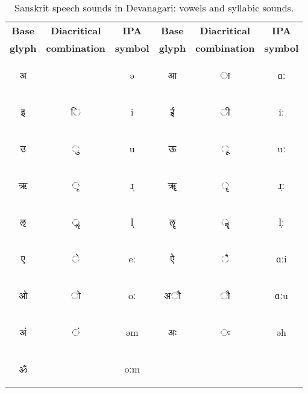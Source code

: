 \documentclass[10pt,a4paper]{article}
\newcommand{\sansk}[1]{\begin{sanskrit}#1\end{sanskrit}}
\begin{document}
\begin{table*}[ht]
	\begin{center}
		\begin{tabular}{|c|c|c||c|c|c|}
			\hline
			\textbf{Base}&\textbf{Diacritical}&\textbf{IPA}&\textbf{Base} &\textbf{Diacritical}&\textbf{IPA} \\
			\textbf{glyph}& \textbf{combination}&\textbf{symbol}&\textbf{glyph}& \textbf{combination}&{\bf symbol}\\\hline%
			
			\sansk{अ}&&ə& \sansk{आ}& \sansk{ा}&ɑː\\\hline
			\sansk{इ}& \sansk{ि}&i&	\sansk{ई}& \sansk{ी}&iː\\\hline
			\sansk{उ}&\sansk{ ु}&u&
			\sansk{ऊ}& \sansk{ ू}&uː\\\hline
			\sansk{ऋ}&\sansk{ ृ}&ɹ̩&\sansk{ॠ} &\sansk{ ॄ}&ɹ̩ː\\\hline
			\sansk{ऌ}&\sansk{	ॢ}&l̩&\sansk{ॡ} &\sansk{ॣ}&l̩ː\\\hline
			\sansk{ए}&\sansk{ े}&eː& \sansk{ऐ} & \sansk{	ै}&ɑːi\\\hline
			\sansk{ओ}& 	\sansk{ो }&oː&	\sansk{	अाै}&\sansk{ाै}&  ɑːu\\\hline
			\sansk{अं}& \sansk{	ं }&əm&	\sansk{अः}&	\sansk{ः} & əh\\\hline
			\sansk{ॐ} &&oːm&&&%
			\\\hline
			
		\end{tabular}
		\caption{Sanskrit speech sounds in Devanagari: vowels and syllabic sounds.}
	\end{center}
	\label{vow}
\end{table*}

\end{document}
